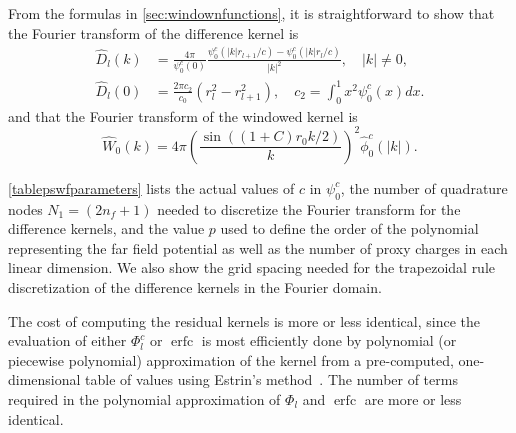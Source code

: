 \documentclass[final,letterpaper]{siamart171218}
\DeclareMathOperator\erfc{erfc}
\newcommand{\be}{\begin{equation}}
\newcommand{\ee}{\end{equation}}
\newcommand{\ba}{\begin{aligned}}
\newcommand{\ea}{\end{aligned}}
\newcommand{\psic}{{\psi_0^c}}
\newcommand{\cR}{r}
\begin{document}
From the formulas in \cref{sec:windownfunctions}, it is straightforward to show that
the Fourier transform of the difference kernel is
\be\label{differencekernelft3}
\ba
\hat{D}_l(k)
& = \frac{4\pi}{\psic(0)}\frac{\psic(|k|\cR_{l+1}/c)-\psic(|k|\cR_l/c)}{|k|^2},
\quad |k|\ne 0,\\
\hat{D}_l(0)&=\frac{2\pi c_2}{c_0}\left(\cR_l^2-\cR_{l+1}^2\right), \quad c_2=\int_0^1 x^2\psic(x)dx.
\ea
\ee
and that the Fourier transform of the windowed kernel is
\be\label{windowedkernelft2}
\widehat{W}_0(k) = 4\pi \left(\frac{\sin((1+C)\cR_0k/2)}{k}\right)^2 \hat{\phi}^c_{0}(|k|).
\ee

\cref{tablepswfparameters} lists the actual values of $c$ in $\psic$, 
the number of quadrature nodes $N_1 = (2n_f+1)$ needed to discretize the Fourier
transform for the difference kernels, and
the value $p$ used to define the order of the polynomial representing
the far field potential as well as the number of proxy
charges in each linear dimension.
We also show the grid spacing needed for the 
trapezoidal rule discretization of the difference kernels in the Fourier domain.

The cost of computing the 
residual kernels is more or less identical, since 
the evaluation of either $\Phi^c_l$ or $\erfc$ is most efficiently done 
by polynomial (or piecewise polynomial) approximation of the kernel from 
a pre-computed, one-dimensional table of values
using Estrin's method~\cite{estrin1960}. The number of terms required in the
polynomial approximation of $\Phi_l$ and $\erfc$ are more or less identical.
\end{document}
